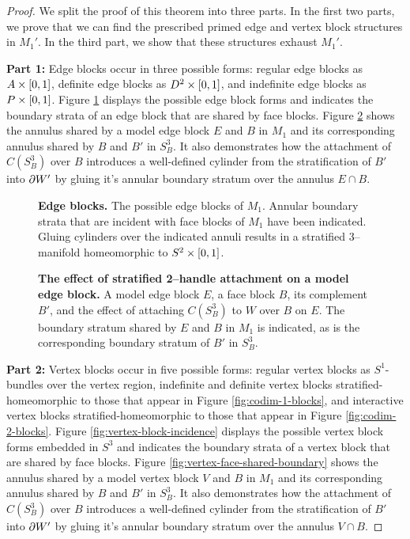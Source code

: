 \begin{proof}
	We split the proof of this theorem into three parts.
	In the first two parts, we prove that we can find the prescribed primed edge and vertex block structures in $M_1'$.
	In the third part, we show that these structures exhaust $M_1'$.
	
	\textbf{Part 1:}
	Edge blocks occur in three possible forms: regular edge blocks as $A\times[0,1]$, definite edge blocks as $D^2\times[0,1]$, and indefinite edge blocks as $P\times[0,1]$.
	Figure \ref{fig:edge-block-incidence} displays the possible edge block forms and indicates the boundary strata of an edge block that are shared by face blocks.
	Figure \ref{fig:edge-face-shared-boundary} shows the annulus shared by a model edge block $E$ and $B$ in $M_1$ and its corresponding annulus shared by $B$ and $B'$ in $S_B^3$.
	It also demonstrates how the attachment of $C(S_B^3)$ over $B$ introduces a well-defined cylinder from the stratification of $B'$ into $\partial W'$ by gluing it's annular boundary stratum over the annulus $E\cap B$.

	\begin{figure}[h!]
		\caption{
			\textbf{Edge blocks.}
			The possible edge blocks of $M_1$.
			Annular boundary strata that are incident with face blocks of $M_1$ have been indicated.
			Gluing cylinders over the indicated annuli results in a stratified 3--manifold homeomorphic to $S^2\times[0,1]$.
		}
		\label{fig:edge-block-incidence}
	\end{figure}
	
	\begin{figure}[h!]
		\caption{
			\textbf{The effect of stratified 2--handle attachment on a model edge block.}
			A model edge block $E$, a face block $B$, its complement $B'$, and the effect of attaching $C(S_B^3)$ to $W$ over $B$ on $E$.
			The boundary stratum shared by $E$ and $B$ in $M_1$ is indicated, as is the corresponding boundary stratum of $B'$ in $S_B^3$.
		}
		\label{fig:edge-face-shared-boundary}
	\end{figure}
	
	\textbf{Part 2:}	
	Vertex blocks occur in five possible forms: regular vertex blocks as $S^1$-bundles over the vertex region, indefinite and definite vertex blocks stratified-homeomorphic to those that appear in Figure \ref{fig:codim-1-blocks}, and interactive vertex blocks stratified-homeomorphic to those that appear in Figure \ref{fig:codim-2-blocks}.
	Figure \ref{fig:vertex-block-incidence} displays the possible vertex block forms embedded in $S^3$ and indicates the boundary strata of a vertex block that are shared by face blocks.
	Figure \ref{fig:vertex-face-shared-boundary} shows the annulus shared by a model vertex block $V$ and $B$ in $M_1$ and its corresponding annulus shared by $B$ and $B'$ in $S_B^3$.
	It also demonstrates how the attachment of $C(S_B^3)$ over $B$ introduces a well-defined cylinder from the stratification of $B'$ into $\partial W'$ by gluing it's annular boundary stratum over the annulus $V\cap B$.
	

\end{proof}
